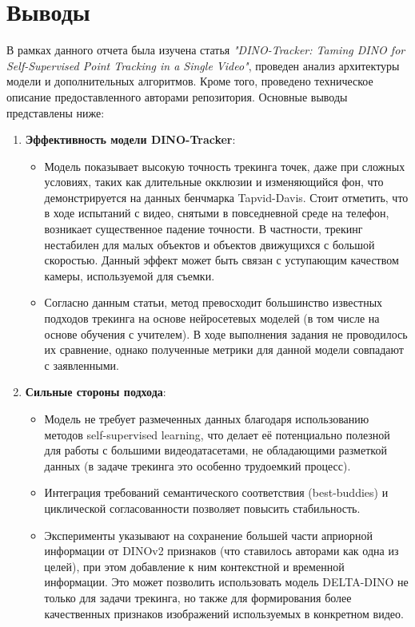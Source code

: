 \documentclass[a4paper, 14pt]{extarticle}
\theoremstyle{definition}
\theoremstyle{plain}
\theoremstyle{remark}
\begin{document}
\newpage


\section{Выводы}

В рамках данного отчета была изучена статья \textit{"DINO-Tracker: Taming DINO for Self-Supervised Point Tracking in a Single Video"}, проведен анализ архитектуры модели и дополнительных алгоритмов. Кроме того, проведено техническое описание предоставленного авторами репозитория. Основные выводы представлены ниже:

\begin{enumerate}
    \item \textbf{Эффективность модели DINO-Tracker}:
    \begin{itemize}
        \item Модель показывает высокую точность трекинга точек, даже при сложных условиях, таких как длительные окклюзии и изменяющийся фон, что демонстрируется на данных бенчмарка Tapvid-Davis. Стоит отметить, что в ходе испытаний с видео, снятыми в повседневной среде на телефон, возникает существенное падение точности. В частности, трекинг нестабилен для малых объектов и объектов движущихся с большой скоростью. Данный эффект может быть связан с уступающим качеством камеры, используемой для съемки. 
        \item Согласно данным статьи, метод превосходит большинство известных подходов трекинга на основе нейросетевых моделей (в том числе на основе обучения с учителем). В ходе выполнения задания не проводилось их сравнение, однако полученные метрики для данной модели совпадают с заявленными.
    \end{itemize}

    \item \textbf{Сильные стороны подхода}:
    \begin{itemize}
        \item Модель не требует размеченных данных благодаря использованию методов self-supervised learning, что делает её потенциально полезной для работы с большими видеодатасетами, не обладающими разметкой данных (в задаче трекинга это особенно трудоемкий процесс).
        \item Интеграция требований семантического соответствия (best-buddies) и циклической согласованности позволяет повысить стабильность.
        \item Эксперименты указывают на сохранение большей части априорной информации от DINOv2 признаков (что ставилось авторами как одна из целей), при этом добавление к ним контекстной и временной информации. Это может позволить использовать модель DELTA-DINO не только для задачи трекинга, но также для формирования более качественных признаков изображений используемых в конкретном видео.
    \end{itemize}


\end{enumerate}
\end{document}
